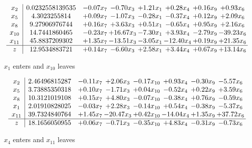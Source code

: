 \documentclass[8pt]{article}
\begin{document}
 \[\begin{array}{c| c c@{\hskip 2pt} c@{\hskip 2pt} c@{\hskip 2pt} c@{\hskip 2pt} c@{\hskip 2pt} c@{\hskip 2pt} }
 x_{2}   &  0.0232558139535 & -0.07 x_{7} & -0.70 x_{3} & +  1.21 x_{1} & +  0.28 x_{4} & +  0.16 x_{9} & +  0.93 x_{6}\\
 x_{5}   &  4.3023255814 & +  0.09 x_{7} & -1.07 x_{3} & -0.28 x_{1} & -0.37 x_{4} & +  0.12 x_{9} & +  2.09 x_{6}\\
 x_{8}   &  9.27906976744 & +  0.16 x_{7} & +  3.63 x_{3} & +  0.51 x_{1} & -0.65 x_{4} & +  0.95 x_{9} & +  2.16 x_{6}\\
 x_{10}   &  14.7441860465 & -0.23 x_{7} & + 16.67 x_{3} & -7.30 x_{1} & +  3.93 x_{4} & -2.79 x_{9} & -39.23 x_{6}\\
 x_{11}   &  45.8837209302 & +  1.35 x_{7} & -13.51 x_{3} & -3.05 x_{1} & -12.40 x_{4} & +  0.19 x_{9} & + 21.35 x_{6}\\
\hline
z    &  12.9534883721 & +  0.14 x_{7} & -6.60 x_{3} & +  2.58 x_{1} & +  3.44 x_{4} & +  0.67 x_{9} & + 13.14 x_{6}\\
\end{array}\]


 $ x_{1} $ enters and $ x_{10} $ leaves 

 \[\begin{array}{c| c c@{\hskip 2pt} c@{\hskip 2pt} c@{\hskip 2pt} c@{\hskip 2pt} c@{\hskip 2pt} c@{\hskip 2pt} }
 x_{2}   &  2.46496815287 & -0.11 x_{7} & +  2.06 x_{3} & -0.17 x_{10} & +  0.93 x_{4} & -0.30 x_{9} & -5.57 x_{6}\\
 x_{5}   &  3.73885350318 & +  0.10 x_{7} & -1.71 x_{3} & +  0.04 x_{10} & -0.52 x_{4} & +  0.22 x_{9} & +  3.59 x_{6}\\
 x_{8}   &  10.3121019108 & +  0.15 x_{7} & +  4.80 x_{3} & -0.07 x_{10} & -0.38 x_{4} & +  0.76 x_{9} & -0.59 x_{6}\\
 x_{1}   &  2.01910828025 & -0.03 x_{7} & +  2.28 x_{3} & -0.14 x_{10} & +  0.54 x_{4} & -0.38 x_{9} & -5.37 x_{6}\\
 x_{11}   &  39.7324840764 & +  1.45 x_{7} & -20.47 x_{3} & +  0.42 x_{10} & -14.04 x_{4} & +  1.35 x_{9} & + 37.72 x_{6}\\
\hline
z    &  18.1656050955 & +  0.06 x_{7} & -0.71 x_{3} & -0.35 x_{10} & +  4.83 x_{4} & -0.31 x_{9} & -0.73 x_{6}\\
\end{array}\]


 $ x_{4} $ enters and $ x_{11} $ leaves 
\end{document}
